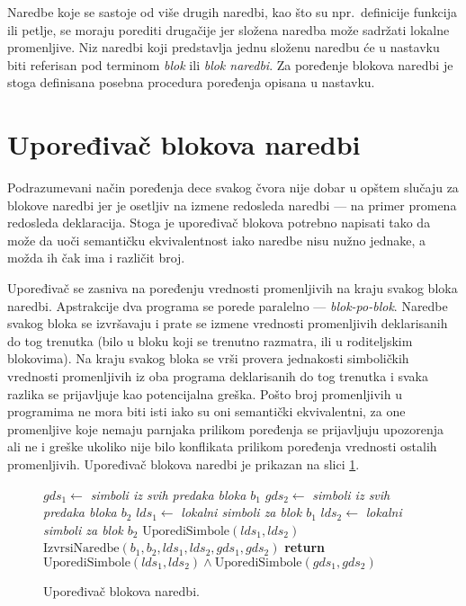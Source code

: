 Naredbe koje se sastoje od više drugih naredbi, kao što su npr.~definicije funkcija ili petlje, se moraju porediti drugačije jer složena naredba može sadržati lokalne promenljive. Niz naredbi koji predstavlja jednu složenu naredbu će u nastavku biti referisan pod terminom \emph{blok} ili \emph{blok naredbi}. Za poređenje blokova naredbi je stoga definisana posebna procedura poređenja opisana u nastavku.


\section{Upoređivač blokova naredbi}
\label{sec:ASTComparingBlocks}

Podrazumevani način poređenja dece svakog čvora nije dobar u opštem slučaju za blokove naredbi jer je osetljiv na izmene redosleda naredbi --- na primer promena redosleda deklaracija. Stoga je upoređivač blokova potrebno napisati tako da može da uoči semantičku ekvivalentnost iako naredbe nisu nužno jednake, a možda ih čak ima i različit broj.

Upoređivač se zasniva na poređenju vrednosti promenljivih na kraju svakog bloka naredbi. Apstrakcije dva programa se porede paralelno --- \emph{blok-po-blok}. Naredbe svakog bloka se izvršavaju i prate se izmene vrednosti promenljivih deklarisanih do tog trenutka (bilo u bloku koji se trenutno razmatra, ili u roditeljskim blokovima). Na kraju svakog bloka se vrši provera jednakosti simboličkih vrednosti promenljivih iz oba programa deklarisanih do tog trenutka i svaka razlika se prijavljuje kao potencijalna greška. Pošto broj promenljivih u programima ne mora biti isti iako su oni semantički ekvivalentni, za one promenljive koje nemaju parnjaka prilikom poređenja se prijavljuju upozorenja ali ne i greške ukoliko nije bilo konflikata prilikom poređenja vrednosti ostalih promenljivih. Upoređivač blokova naredbi je prikazan na slici \ref{fig:ComparisonAlgorithmBlocksPseudo}.

\begin{figure}[!h]
\begin{algorithmic}[1]
\State $gds_1 \gets $ \emph{simboli iz svih predaka bloka $b_1$}
\State $gds_2 \gets $ \emph{simboli iz svih predaka bloka $b_2$}
\State $lds_1 \gets $ \emph{lokalni simboli za blok $b_1$}
\State $lds_2 \gets $ \emph{lokalni simboli za blok $b_2$}
\State $\text{UporediSimbole}(lds_1, lds_2)$
\State $\text{IzvrsiNaredbe}(b_1, b_2, lds_1, lds_2, gds_1, gds_2)$
\State \textbf{return} $\text{UporediSimbole}(lds_1, lds_2) \wedge \text{UporediSimbole}(gds_1, gds_2)$
\EndProcedure
\end{algorithmic}
\caption{Upoređivač blokova naredbi.}
\label{fig:ComparisonAlgorithmBlocksPseudo}
\end{figure}

